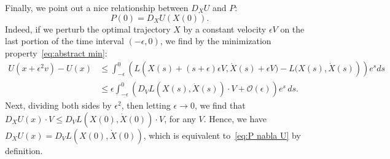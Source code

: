 \documentclass[10pt]{amsart}
\theoremstyle{definition}\newtheorem{defi}[theo]{Definition}\newtheorem{rema}[theo]{Remark}\newtheorem{exam}[theo]{Example}\newtheorem{exem}[theo]{Example}\newtheorem{nota}[theo]{Notation}
\newcommand{\mO}{\mathcal{O}}
\newcommand{\1}{\mathds{1}}
\begin{document}
Finally, we point out a nice relationship between $D_X U$ and $P$:
\begin{equation}\label{eq:P nabla U}
P(0) = D_X U (X(0)).
\end{equation}
Indeed, if we perturb the optimal trajectory $X$ by a constant velocity $\epsilon V$ on the last portion of the time interval $(-\epsilon,0)$, we find by the minimization property~\eqref{eq:abstract min}:
\begin{align*}
U(x + \epsilon^2 v) - U(x) &\leq \int_{-\epsilon}^0\left(L\left(X(s) + (s+\epsilon)\epsilon V, \dot X(s) + \epsilon V) - L(X(s), \dot X(s)\right) \right) e^s ds\\
& \leq \epsilon \int_{-\epsilon}^0\left(D_V L\left(X(s),\dot X(s)\right)\cdot V + \mO(\epsilon)\right) e^s\, ds.
\end{align*}
Next, dividing both sides by $\epsilon^2$, then letting $\epsilon\to 0$, we find that $D_XU(x) \cdot V \leq D_V L(X(0),\dot X(0))\cdot V$, for any $V$. Hence, we have $D_XU(x) = D_V L(X(0),\dot X(0))$, which is equivalent to~\eqref{eq:P nabla U} by definition.
\end{document}
